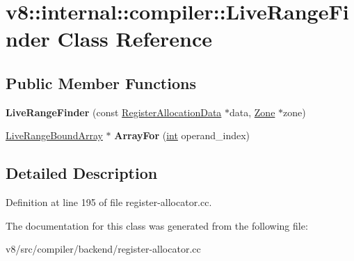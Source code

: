 \hypertarget{classv8_1_1internal_1_1compiler_1_1LiveRangeFinder}{}\section{v8\+:\+:internal\+:\+:compiler\+:\+:Live\+Range\+Finder Class Reference}
\label{classv8_1_1internal_1_1compiler_1_1LiveRangeFinder}
\subsection*{Public Member Functions}
\begin{DoxyCompactItemize}
\item 
\mbox{\label{classv8_1_1internal_1_1compiler_1_1LiveRangeFinder_aa466311c1598d719296a7bd732ae155d}} 
{\bfseries Live\+Range\+Finder} (const \mbox{\hyperlink{classv8_1_1internal_1_1compiler_1_1RegisterAllocationData}{Register\+Allocation\+Data}} $\ast$data, \mbox{\hyperlink{classv8_1_1internal_1_1Zone}{Zone}} $\ast$zone)
\item 
\mbox{\label{classv8_1_1internal_1_1compiler_1_1LiveRangeFinder_ac9eaa169d8d8480eeb220ef091d46820}} 
\mbox{\hyperlink{classv8_1_1internal_1_1compiler_1_1LiveRangeBoundArray}{Live\+Range\+Bound\+Array}} $\ast$ {\bfseries Array\+For} (\mbox{\hyperlink{classint}{int}} operand\+\_\+index)
\end{DoxyCompactItemize}


\subsection{Detailed Description}


Definition at line 195 of file register-\/allocator.\+cc.



The documentation for this class was generated from the following file\+:\begin{DoxyCompactItemize}
\item 
v8/src/compiler/backend/register-\/allocator.\+cc\end{DoxyCompactItemize}
